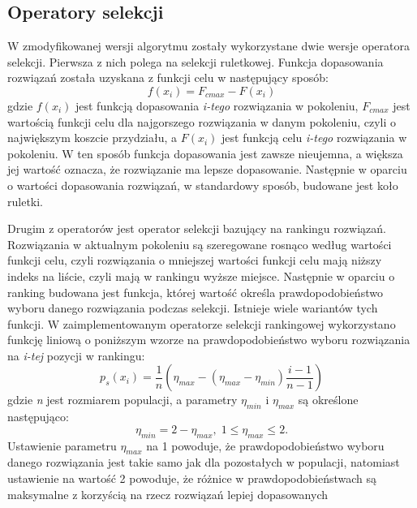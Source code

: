 \subsection{Operatory selekcji}
W zmodyfikowanej wersji algorytmu zostały wykorzystane dwie wersje operatora selekcji. Pierwsza z nich polega na selekcji ruletkowej. Funkcja dopasowania rozwiązań została uzyskana z funkcji celu w następujący sposób:
\newline
\begin{equation}
f(x_i)= F_{c max} - F(x_i)
\end{equation}
\newline
gdzie $f(x_i)$ jest funkcją dopasowania \textit{i-tego} rozwiązania w pokoleniu, $F_{c max}$ jest wartością funkcji celu dla najgorszego rozwiązania w danym pokoleniu, czyli o największym koszcie przydziału, a $F(x_i)$ jest funkcją celu \textit{i-tego} rozwiązania w pokoleniu. W ten sposób funkcja dopasowania jest zawsze nieujemna, a większa jej wartość oznacza, że rozwiązanie ma lepsze dopasowanie. Następnie w oparciu o wartości dopasowania rozwiązań, w standardowy sposób, budowane jest koło ruletki.

Drugim z operatorów jest operator selekcji bazujący na rankingu rozwiązań. Rozwiązania w aktualnym pokoleniu są szeregowane rosnąco według wartości funkcji celu, czyli rozwiązania o mniejszej wartości funkcji celu mają niższy indeks na liście, czyli mają w rankingu wyższe miejsce. Następnie w oparciu o ranking budowana jest funkcja, której wartość określa prawdopodobieństwo wyboru danego rozwiązania podczas selekcji. Istnieje wiele wariantów tych funkcji. W zaimplementowanym operatorze selekcji rankingowej wykorzystano funkcję liniową o poniższym wzorze na prawdopodobieństwo wyboru rozwiązania na \textit{i-tej} pozycji w rankingu:
\newline
\begin{equation}
p_s(x_i)=\frac{1}{n}(\eta_{max}-(\eta_{max}-\eta_{min})\frac{i-1}{n-1})
\end{equation}
\newline
gdzie \textit{n} jest rozmiarem populacji, a parametry $\eta_{min}$ i $\eta_{max}$ są określone następująco:
\newline
\begin{equation}
\eta_{min}=2-\eta_{max},\; 1 \leq \eta_{max} \leq 2.
\end{equation}
\newline
Ustawienie parametru $\eta_{max}$ na 1 powoduje, że prawdopodobieństwo wyboru danego rozwiązania jest takie samo jak dla pozostałych w populacji, natomiast ustawienie na wartość 2 powoduje, że różnice w prawdopodobieństwach są maksymalne z korzyścią na rzecz rozwiązań lepiej dopasowanych

